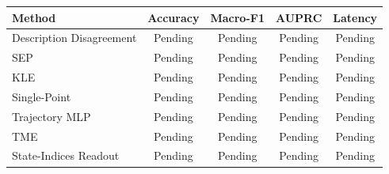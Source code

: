 \begin{tabular}{lcccc}
\toprule
Method & Accuracy & Macro-F1 & AUPRC & Latency \\
\midrule
Description Disagreement & Pending & Pending & Pending & Pending \\
SEP & Pending & Pending & Pending & Pending \\
KLE & Pending & Pending & Pending & Pending \\
Single-Point & Pending & Pending & Pending & Pending \\
Trajectory MLP & Pending & Pending & Pending & Pending \\
TME & Pending & Pending & Pending & Pending \\
State-Indices Readout & Pending & Pending & Pending & Pending \\
\bottomrule
\end{tabular}
